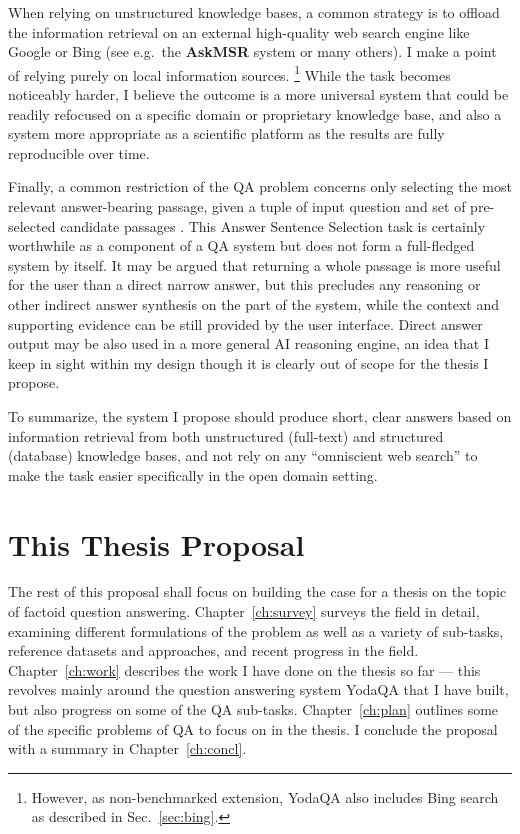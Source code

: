 When relying on unstructured knowledge bases, a common strategy is to offload
the information retrieval on an external high-quality web search engine
like Google or Bing (see e.g.\ the \textbf{AskMSR} system \cite{AskMSR}
or many others).
I make a point of relying purely on local information sources.%
\footnote{However, as non-benchmarked extension, YodaQA also includes
	Bing search as described in Sec.~\ref{sec:bing}.}
While the task becomes noticeably harder,
I believe the outcome is a more
universal system that could be readily refocused on a specific domain
or proprietary knowledge base, and also a system more appropriate as
a scientific platform as the results are fully reproducible over time.

Finally, a common restriction of the QA problem concerns only selecting
the most relevant answer-bearing passage, given a tuple of input question
and set of pre-selected candidate passages \cite{WangQAGrammar}.
This Answer Sentence Selection task is certainly
worthwhile as a component of a QA system but does not form a full-fledged
system by itself.
It may be argued that returning a whole passage is more useful for the user than a direct narrow answer,
but this precludes any reasoning or other indirect answer synthesis on the part of the system,
while the context and supporting evidence can be still provided by the user interface.
Direct answer output may be also used in a more general AI reasoning engine,
an idea that I keep in sight within my design though it is clearly
out of scope for the thesis I propose.

To summarize, the system I propose should produce short, clear answers
based on information retrieval from both
unstructured (full-text) and structured (database) knowledge bases,
and not rely on any ``omniscient web search'' to make the task easier
specifically in the open domain setting.

\section{This Thesis Proposal}

The rest of this proposal shall focus on building the case for
a thesis on the topic of factoid question answering.
Chapter~\ref{ch:survey}
surveys the field in detail, examining different formulations of the problem
as well as a variety of sub-tasks, reference datasets and approaches,
and recent progress in the field.
Chapter~\ref{ch:work} describes
the work I have done on the thesis so far --- this revolves mainly around
the question answering system YodaQA that I have built, but also progress
on some of the QA sub-tasks.
Chapter~\ref{ch:plan} outlines some of the specific problems of QA
to focus on in the thesis.
I conclude the proposal with a summary in Chapter~\ref{ch:concl}.
